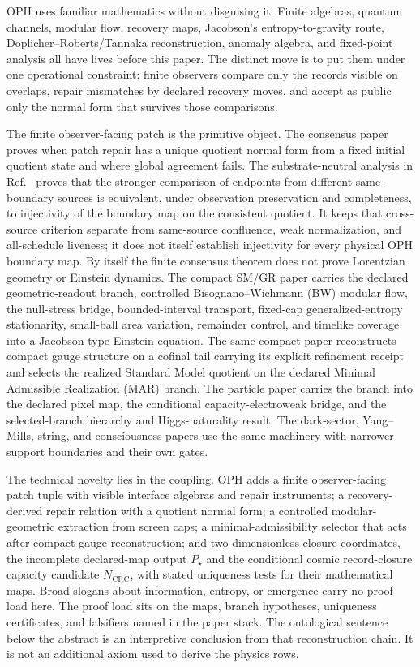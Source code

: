 \documentclass[11pt]{article}
\begin{document}
OPH uses familiar mathematics without disguising it. Finite algebras, quantum channels, modular
flow, recovery maps, Jacobson's entropy-to-gravity route, Doplicher--Roberts/Tannaka
reconstruction, anomaly algebra, and fixed-point analysis all have lives before this paper. The
distinct move is to put them under one operational constraint: finite observers compare only the
records visible on overlaps, repair mismatches by declared recovery moves, and accept as public only
the normal form that survives those comparisons.

The finite observer-facing patch is the primitive object. The consensus paper proves when patch
repair has a unique quotient normal form from a fixed initial quotient state and where global
agreement fails. The substrate-neutral analysis in Ref.~\cite{observableNormalForms} proves that
the stronger comparison of endpoints from different same-boundary sources is equivalent, under
observation preservation and completeness, to injectivity of the boundary map on the consistent
quotient. It keeps that cross-source criterion separate from same-source confluence, weak
normalization, and all-schedule liveness; it does not itself establish injectivity for every
physical OPH boundary map. By itself the finite consensus theorem does not prove Lorentzian
geometry or Einstein dynamics. The compact SM/GR paper
carries the declared geometric-readout branch, controlled Bisognano--Wichmann (BW) modular flow, the null-stress bridge,
bounded-interval transport, fixed-cap generalized-entropy stationarity, small-ball area variation,
remainder control, and timelike coverage into a Jacobson-type Einstein equation. The same compact
paper reconstructs compact gauge structure on a cofinal tail carrying its explicit refinement
receipt and selects the realized Standard Model quotient on the declared Minimal Admissible
Realization (MAR) branch. The particle paper carries the branch into
the declared pixel map, the conditional capacity-electroweak bridge, and the selected-branch hierarchy and
Higgs-naturality result. The dark-sector, Yang--Mills, string, and consciousness papers use the
same machinery with narrower support boundaries and their own gates.

The technical novelty lies in the coupling. OPH adds a finite observer-facing patch tuple with
visible interface algebras and repair instruments; a recovery-derived repair relation with a
quotient normal form; a controlled modular-geometric extraction from screen caps; a
minimal-admissibility selector that acts after compact gauge reconstruction; and two dimensionless
closure coordinates, the incomplete declared-map output \(P_\star\) and the conditional
cosmic record-closure capacity candidate \(N_{\mathrm{CRC}}\), with stated uniqueness tests for their mathematical maps. Broad
slogans about information, entropy, or emergence carry no proof load here. The proof load sits on
the maps, branch hypotheses, uniqueness certificates, and falsifiers named in the paper stack.
The ontological sentence below the abstract is an interpretive conclusion from that reconstruction
chain. It is not an additional axiom used to derive the physics rows.
\end{document}
